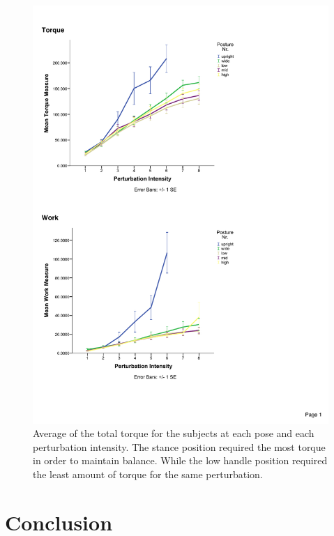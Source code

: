 \begin{figure}
  \centering \includegraphics[trim = 1mm 150mm 10mm 10mm, clip, scale =
    0.95]{Morteza/figs/errorBarPlotsSEM-norm_v2}
  \caption{Average of the total torque for the subjects at each pose and each
    perturbation intensity.  The stance position required the most torque in
    order to maintain balance.  While the low handle position required the
    least amount of torque for the same perturbation.}
  \label{jointtorque}
\end{figure}


\section{Conclusion} 
\label{sec:conclusion}

